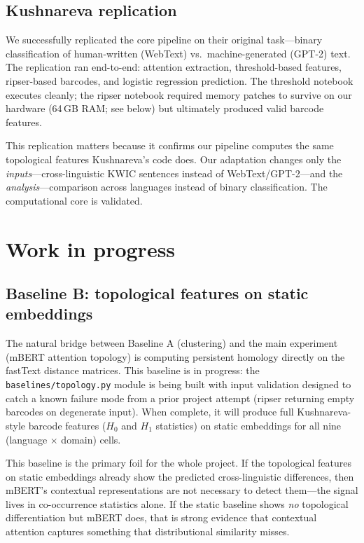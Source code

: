 \subsection{Kushnareva replication}

We successfully replicated the core \textcite{kushnareva2021} pipeline on their original task---binary classification of human-written (WebText) vs.\ machine-generated (GPT-2) text. The replication ran end-to-end: attention extraction, threshold-based features, ripser-based barcodes, and logistic regression prediction. The threshold notebook executes cleanly; the ripser notebook required memory patches to survive on our hardware (64\,GB RAM; see below) but ultimately produced valid barcode features.

This replication matters because it confirms our pipeline computes the same topological features Kushnareva's code does. Our adaptation changes only the \emph{inputs}---cross-linguistic KWIC sentences instead of WebText/GPT-2---and the \emph{analysis}---comparison across languages instead of binary classification. The computational core is validated.

\section{Work in progress}

\subsection{Baseline B: topological features on static embeddings}

The natural bridge between Baseline A (clustering) and the main experiment (mBERT attention topology) is computing persistent homology directly on the fastText distance matrices. This baseline is in progress: the \texttt{baselines/topology.py} module is being built with input validation designed to catch a known failure mode from a prior project attempt (ripser returning empty barcodes on degenerate input). When complete, it will produce full Kushnareva-style barcode features ($H_0$ and $H_1$ statistics) on static embeddings for all nine (language $\times$ domain) cells.

This baseline is the primary foil for the whole project. If the topological features on static embeddings already show the predicted cross-linguistic differences, then mBERT's contextual representations are not necessary to detect them---the signal lives in co-occurrence statistics alone. If the static baseline shows \emph{no} topological differentiation but mBERT does, that is strong evidence that contextual attention captures something that distributional similarity misses.


